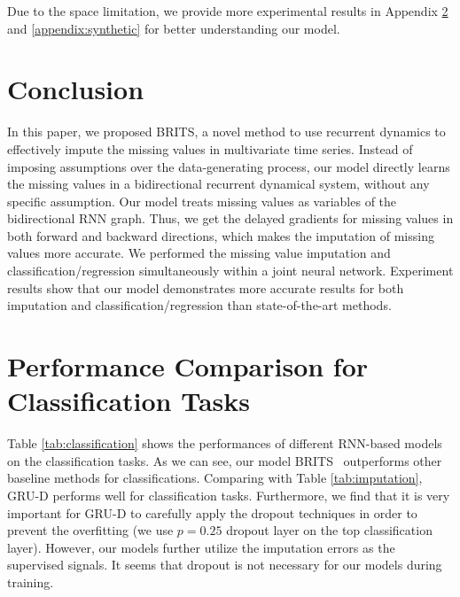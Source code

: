 \documentclass{article}
\newcommand{\brits}{\xspace{BRITS}}
\newcommand{\methodname}{\xspace{BRITS}}
\begin{document}
Due to the space limitation, we provide more experimental results in Appendix \ref{appendix:classification} and \ref{appendix:synthetic} for better understanding our model.









%
 
\section{Conclusion}
\label{sec:conclusion}
In this paper, we proposed \methodname, a novel method to use recurrent dynamics to effectively impute the missing values in multivariate time series. Instead of imposing assumptions over the data-generating process, our model directly learns the missing values in a bidirectional recurrent dynamical system, without any specific assumption. Our model treats missing values as variables of the bidirectional RNN graph. Thus, we get the delayed gradients for missing values in both forward and backward directions, which makes the imputation of missing values more accurate. We performed the missing value imputation and classification/regression simultaneously within a joint neural network. Experiment results show that our model demonstrates more accurate results for both imputation and classification/regression than state-of-the-art methods. 


\newpage
\appendix

 \section{Performance Comparison for Classification Tasks}
 \label{appendix:classification}
 Table \ref{tab:classification} shows the performances of different RNN-based models on the classification tasks. As we can see, our model \brits~ outperforms other baseline methods for classifications. Comparing with Table \ref{tab:imputation}, GRU-D performs well for classification tasks. Furthermore, we find that it is very important for GRU-D to carefully apply the dropout techniques in order to prevent the overfitting (we use $p = 0.25$ dropout layer on the top classification layer). However, our models further utilize the imputation errors as the supervised signals. It seems that dropout is not necessary for our models during training.
 
\end{document}
